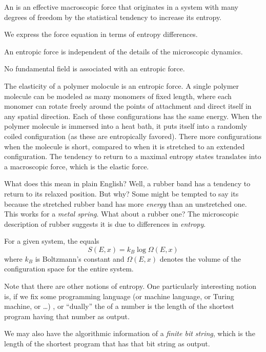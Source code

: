 \begin{defn}
An  is an effective macroscopic force that
originates in a system with many degrees of freedom by the
statistical tendency to increase its entropy.
\end{defn}

We express the force equation in terms of entropy differences.

\begin{prop}
An entropic force is independent of the details of the
microscopic dynamics.
\end{prop}

\begin{prop}
No fundamental field is associated with an entropic force.
\end{prop}

\begin{ex}
The elasticity of a polymer molocule is an entropic force. A
single polymer molecule can be modeled as many monomers of fixed
length, where each monomer can rotate freely around the points of
attachment and direct itself in any spatial direction. Each of
these configurations has the same energy. When the polymer
molecule is immersed into a heat bath, it puts itself into a
randomly coiled configuration (as these are entropically
favored). There more configurations when the molecule is short,
compared to when it is stretched to an extended
configuration. The tendency to return to a maximal entropy states
translates into a macroscopic force, which is the elastic force.

What does this mean in plain English? Well, a rubber band has a
tendency to return to its relaxed position. But why? Some might
be tempted to say its because the stretched rubber band has more
\emph{energy} than an unstretched one. This works for a
\emph{metal spring}. What about a rubber one? The microscopic
description of rubber suggests it is due to differences in
\emph{entropy}. 
\end{ex}



\begin{defn}
For a given system, the  equals
\begin{equation}
S(E,x)=k_{B}\log\Omega(E,x)
\end{equation}
where $k_{B}$ is Boltzmann's constant and $\Omega(E,x)$ denotes
the volume of the configuration space for the entire system.
\end{defn}
\begin{rmk}
Note that there are other notions of entropy. One particularly
interesting notion is, if we fix some programming language (or
machine language, or Turing machine, or \dots)
, or ``dually'' the
 of a number is the length of the
shortest program having that number as output.  

We may also have the algorithmic information of a \emph{finite
bit string}, which is the length of the shortest program that has
that bit string as output. 
\end{rmk}
